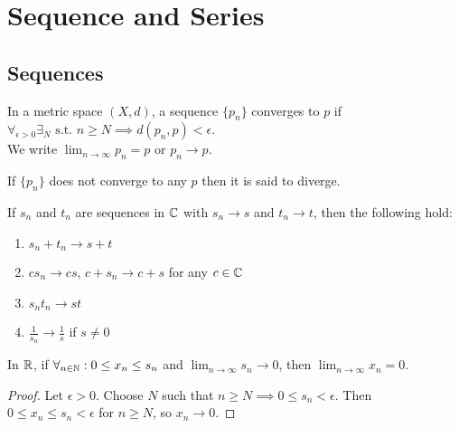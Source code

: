 \chapter{Sequence and Series}

\section{Sequences}

\begin{definition}
	In a metric space $(X,d)$, a sequence $\{p_n\}$ converges to $p$ if $\forall_{\epsilon>0}\exists_{N} \text{ s.t. } n\ge N \implies d(p_n,p)<\epsilon$.\\
	We write $\lim_{n\to\infty} p_n = p$ or $p_n \to p$.
\end{definition}


If $\{p_n\}$ does not converge to any $p$ then it is said to diverge.






\begin{thm}[3]
	If ${s}_{n}$ and ${t}_{n}$ are sequences in $\mathbb{C}$ with ${s}_{n} \to s$ and ${t}_{n} \to t$, then the following hold:
	\begin{enumerate}
		\item ${s}_{n} + {t}_{n} \to s + t$
		\item $c s_n \to cs$, $c+s_n\to c+s$ for any $c\in \mathbb{C}$
		\item $s_n t_n\to st$
		\item $\frac{1}{s_n}\to \frac{1}{s}$ if $s\neq 0$
	\end{enumerate}
\end{thm}

\begin{lemma}
	\label{lem:3.4}
	In $\mathbb{R}$, if $\forall_{n \in \mathbb{N}}: 0 \le x_n \le s_n$ and $\lim_{n\to \infty }s_n \to 0$, then $\lim_{n\to \infty} x_n = 0$.
	\begin{proof}
		Let $\epsilon > 0$. Choose $N$ such that $n\ge N \implies 0\le s_n < \epsilon$. Then $0 \le x_n \le s_n < \epsilon$ for $n\ge N$, so $x_n \to 0$.
	\end{proof}
\end{lemma}

